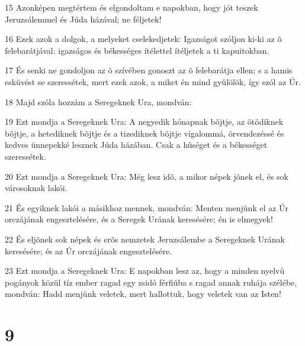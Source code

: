 \par 15 Azonképen megtértem és elgondoltam e napokban, hogy jót teszek Jeruzsálemmel és Júda házával; ne féljetek!
\par 16 Ezek azok a dolgok, a melyeket cselekedjetek: Igazságot szóljon ki-ki az õ felebarátjával: igazságos és békességes ítélettel ítéljetek a ti kapuitokban.
\par 17 És senki ne gondoljon az õ szívében gonoszt az õ felebarátja ellen; s a hamis esküvést se szeressétek, mert ezek azok, a miket én mind gyûlölök, így szól az Úr.
\par 18 Majd szóla hozzám a Seregeknek Ura, mondván:
\par 19 Ezt mondja a Seregeknek Ura: A negyedik hónapnak bõjtje, az ötödiknek bõjtje, a hetediknek bõjtje és a tizediknek bõjtje vígalommá, örvendezéssé és kedves ünnepekké lesznek Júda házában. Csak a hûséget és a békességet szeressétek.
\par 20 Ezt mondja a Seregeknek Ura: Még lesz idõ, a mikor népek jõnek el, és sok városoknak lakói.
\par 21 És egyiknek lakói a másikhoz mennek, mondván: Menten menjünk el az Úr orczájának engesztelésére, és a Seregek Urának keresésére; én is elmegyek!
\par 22 És eljõnek sok népek és erõs nemzetek Jeruzsálembe a Seregeknek Urának keresésére; és az Úr orczájának engesztelésére.
\par 23 Ezt mondja a Seregeknek Ura: E napokban lesz az, hogy a minden nyelvû pogányok közül tíz ember ragad egy zsidó férfiúba s ragad annak ruhája szélébe, mondván: Hadd menjünk veletek, mert hallottuk, hogy veletek van az Isten!

\chapter{9}

